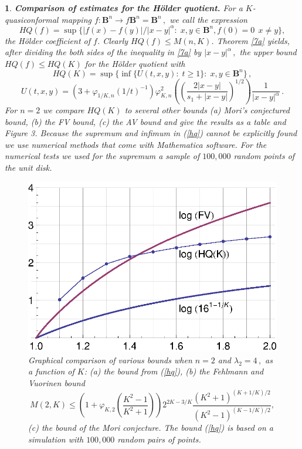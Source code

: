 \documentclass[12pt,a4paper,leqno]{amsart}
\theoremstyle{plain}
\newtheorem{subsec}[equation]{}
\numberwithin{equation}{section}          %
\begin{document}
\begin{subsec}{\bf Comparison of estimates for the H\"older quotient.}
{\rm For a $K$-quasiconformal mapping
$f:\mathbf{B}^n\to f\mathbf{B}^n=\mathbf{B}^n\, , $
we call the expression
$$HQ(f)=\sup\{|f(x)-f(y)|/|x-y|^\alpha:\; x,y\in\mathbf{B}^n, f(0)=0\,\;x\neq y \},$$
the H\"older coefficient of $f$. Clearly $HQ(f)\leq M(n,K)$. Theorem
\ref{7a} yields, after dividing the both sides of the inequality in
\ref{7a} by $|x-y|^{\alpha}\,,$ the upper bound $HQ(f)\le HQ(K)$ for
the H\"older quotient with
\begin{equation}\label{hq}
HQ(K)= \sup\{\inf \{U(t,x,y): \;t\geq 1\}: \; x,y\in\mathbf{B}^n\} \, ,
\end{equation}
$$U(t,x,y)=(3+\varphi_{1/K,n}(1/t)^{-1})
\varphi_{K,n}^2\left(\left(\frac{2|x-y|}{s_1+|x-y|}\right)^{1/2}\right)\frac{1}{|x-y|^\alpha}\,.$$
For $n=2$ we compare $HQ(K)$ to several other bounds (a) Mori's
conjectured bound, (b) the FV bound, (c) the AV bound and give the
results as a table and Figure 3. Because the supremum and infimum in
(\ref{hq}) cannot be explicitly found we use numerical methods that
come with Mathematica software. For the numerical tests we used for
the supremum a sample of $100,000$ random points of the unit disk.}

\bigskip
\begin{figure}
\includegraphics[width=12cm]{newHQfig.eps}
\caption{Graphical comparison of various bounds
 when $n=2$ and $\lambda_2=4\,,$ as a function of $K$:
(a) the bound from (\ref{hq}),  (b) the Fehlmann and Vuorinen bound \cite{fv}
$$M(2,K) \le \left(1+\varphi_{K,2}\left(\frac{K^2-1}{K^2+1}\right)\right)2^{2K-3/K}
\frac{(K^2+1)^{(K+1/K)/2}}{(K^2-1)^{(K-1/K)/2}},$$ (c) the bound of the Mori conjecture.
The bound  (\ref{hq}) is based on a simulation with  $100,000$ random pairs of points.}
\end{figure}


\end{subsec}
\end{document}
